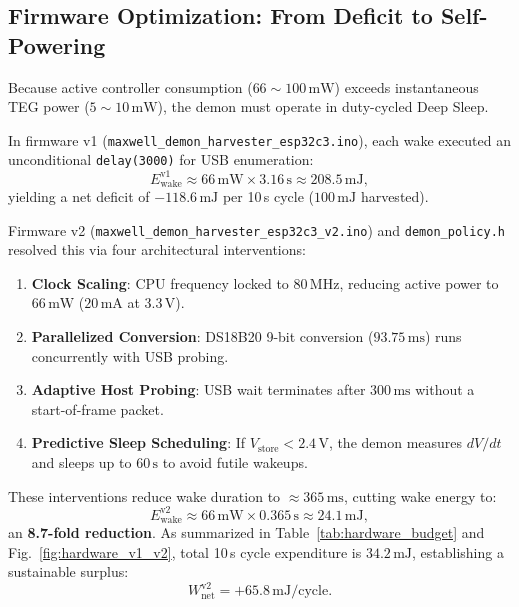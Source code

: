 \documentclass[10pt,twocolumn,a4paper]{article}
\begin{document}
\subsection{Firmware Optimization: From Deficit to Self-Powering}
Because active controller consumption ($66 \sim 100\,\mathrm{mW}$) exceeds instantaneous TEG power ($5 \sim 10\,\mathrm{mW}$), the demon must operate in duty-cycled Deep Sleep.

In firmware v1 (\texttt{maxwell\_demon\_}\allowbreak\texttt{harvester\_esp32c3.ino}), each wake executed an unconditional \texttt{delay(3000)} for USB enumeration:
\begin{equation}
E_{\mathrm{wake}}^{\mathrm{v1}} \approx 66\,\mathrm{mW} \times 3.16\,\mathrm{s} \approx 208.5\,\mathrm{mJ},
\end{equation}
yielding a net deficit of $-118.6\,\mathrm{mJ}$ per 10\,s cycle ($100\,\mathrm{mJ}$ harvested).

Firmware v2 (\texttt{maxwell\_demon\_}\allowbreak\texttt{harvester\_esp32c3\_v2.ino}) and \texttt{demon\_policy.h} resolved this via four architectural interventions:
\begin{enumerate}
    \item \textbf{Clock Scaling}: CPU frequency locked to $80\,\mathrm{MHz}$, reducing active power to $66\,\mathrm{mW}$ ($20\,\mathrm{mA}$ at $3.3\,\mathrm{V}$).
    \item \textbf{Parallelized Conversion}: DS18B20 9-bit conversion ($93.75\,\mathrm{ms}$) runs concurrently with USB probing.
    \item \textbf{Adaptive Host Probing}: USB wait terminates after $300\,\mathrm{ms}$ without a start-of-frame packet.
    \item \textbf{Predictive Sleep Scheduling}: If $V_{\mathrm{store}} < 2.4\,\mathrm{V}$, the demon measures $dV/dt$ and sleeps up to $60\,\mathrm{s}$ to avoid futile wakeups.
\end{enumerate}

These interventions reduce wake duration to $\approx 365\,\mathrm{ms}$, cutting wake energy to:
\begin{equation}
E_{\mathrm{wake}}^{\mathrm{v2}} \approx 66\,\mathrm{mW} \times 0.365\,\mathrm{s} \approx 24.1\,\mathrm{mJ},
\end{equation}
an \textbf{8.7-fold reduction}. As summarized in Table~\ref{tab:hardware_budget} and Fig.~\ref{fig:hardware_v1_v2}, total 10\,s cycle expenditure is $34.2\,\mathrm{mJ}$, establishing a sustainable surplus:
\begin{equation}
W_{\mathrm{net}}^{\mathrm{v2}} = +65.8\,\mathrm{mJ} / \mathrm{cycle}.
\end{equation}
\end{document}
